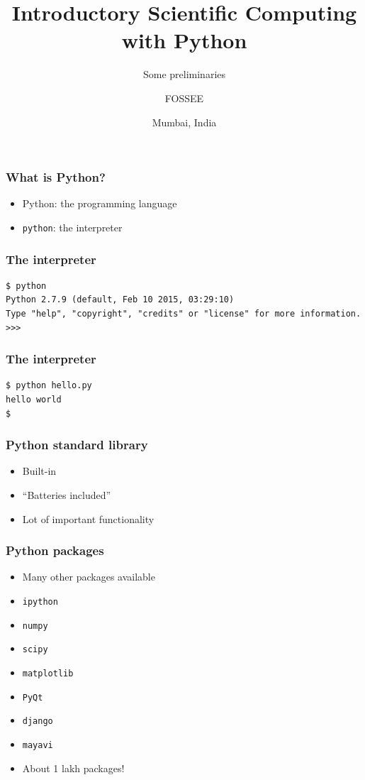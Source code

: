 \documentclass[14pt,compress]{beamer}
\title[Preliminaries]{Introductory Scientific Computing with
Python}
\subtitle{Some preliminaries}
\author[FOSSEE] {FOSSEE}
\institute[IIT Bombay] {Department of Aerospace Engineering\\IIT Bombay}
\date[] {Mumbai, India
}
\newcommand{\typ}[1]{\lstinline{#1}}
\begin{document}
\begin{frame}
  \maketitle
\end{frame}

\begin{frame}[plain]
  \frametitle{What is Python?}
  \large
  \begin{itemize}
  \item Python: the programming language

    \vspace*{0.5in}
  \item \typ{python}: the interpreter
  \end{itemize}
\end{frame}

\begin{frame}[fragile]
  \frametitle{The interpreter}
  \small
  \begin{lstlisting}
$ python
Python 2.7.9 (default, Feb 10 2015, 03:29:10)
Type "help", "copyright", "credits" or "license" for more information.
>>>
\end{lstlisting} %
\end{frame}

\begin{frame}[fragile]
  \frametitle{The interpreter}
  \small
\begin{lstlisting}
$ python hello.py
hello world
$
\end{lstlisting}
\end{frame}

\begin{frame}[plain]
  \frametitle{Python standard library}
  \begin{itemize}
  \item Built-in
  \item ``Batteries included''
  \item Lot of important functionality
  \end{itemize}
\end{frame}

\begin{frame}[plain]
  \frametitle{Python packages}
  \begin{itemize}
  \item Many other packages available
  \item \typ{ipython}
  \item \typ{numpy}
  \item \typ{scipy}
  \item \typ{matplotlib}
  \item \typ{PyQt}
  \item \typ{django}
  \item \typ{mayavi}
  \item About 1 lakh packages!
  \end{itemize}
\end{frame}
\end{document}
